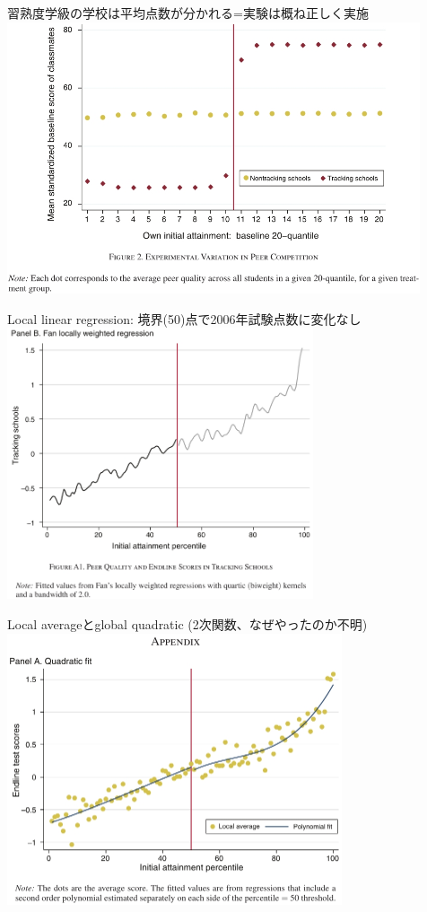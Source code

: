 \begin{frame}{}
習熟度学級の学校は平均点数が分かれる=実験は概ね正しく実施\\
\hfil\includegraphics[height = 8cm]{ImpactEvaluation/figure/DufloDupasKremer_KenyaTrackingPeerEffectFigure2.jpg}
\end{frame}
\begin{frame}{}
Local linear regression: 境界(50)点で2006年試験点数に変化なし\\
\hfil\includegraphics[height = 8cm]{ImpactEvaluation/figure/DufloDupasKremer_KenyaTrackingPeerEffectFigureA1PanelB.jpg}
\end{frame}
\begin{frame}{}
Local averageとglobal quadratic (2次関数、なぜやったのか不明)\\
\hfil\includegraphics[height = 8cm]{ImpactEvaluation/figure/DufloDupasKremer_KenyaTrackingPeerEffectFigureA1PanelA.jpg}
\end{frame}
